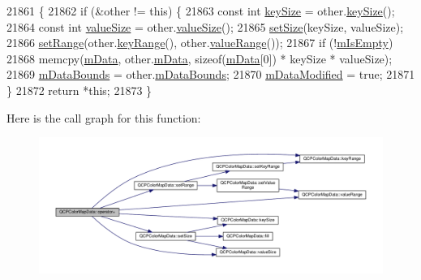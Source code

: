 \begin{DoxyCode}
21861                                                                         \{
21862   \textcolor{keywordflow}{if} (&other != \textcolor{keyword}{this}) \{
21863     \textcolor{keyword}{const} \textcolor{keywordtype}{int} \hyperlink{class_q_c_p_color_map_data_aa8d7811686fdfea964947715210c4af8}{keySize} = other.\hyperlink{class_q_c_p_color_map_data_aa8d7811686fdfea964947715210c4af8}{keySize}();
21864     \textcolor{keyword}{const} \textcolor{keywordtype}{int} \hyperlink{class_q_c_p_color_map_data_ab880be6bc587f34e8d22fe77ef6b57e9}{valueSize} = other.\hyperlink{class_q_c_p_color_map_data_ab880be6bc587f34e8d22fe77ef6b57e9}{valueSize}();
21865     \hyperlink{class_q_c_p_color_map_data_a0d9ff35c299d0478b682bfbcdd9c097e}{setSize}(keySize, valueSize);
21866     \hyperlink{class_q_c_p_color_map_data_aad9c1c7c703c1339489fc730517c83d4}{setRange}(other.\hyperlink{class_q_c_p_color_map_data_a4765180639742460f64ab6c97c745c08}{keyRange}(), other.\hyperlink{class_q_c_p_color_map_data_a025be4d7ba0494fd7b38a5a56c737f2a}{valueRange}());
21867     \textcolor{keywordflow}{if} (!\hyperlink{class_q_c_p_color_map_data_a10e91aa89ed05bd177b1f81e07b465b8}{mIsEmpty})
21868       memcpy(\hyperlink{class_q_c_p_color_map_data_ac1682862022f575191351c9825187d39}{mData}, other.\hyperlink{class_q_c_p_color_map_data_ac1682862022f575191351c9825187d39}{mData}, \textcolor{keyword}{sizeof}(\hyperlink{class_q_c_p_color_map_data_ac1682862022f575191351c9825187d39}{mData}[0]) * keySize * valueSize);
21869     \hyperlink{class_q_c_p_color_map_data_a1798b3dcc0a27091d196bfd156dcb3f2}{mDataBounds} = other.\hyperlink{class_q_c_p_color_map_data_a1798b3dcc0a27091d196bfd156dcb3f2}{mDataBounds};
21870     \hyperlink{class_q_c_p_color_map_data_ad3cc682da2ac14e5acdbc05cf4d3d93b}{mDataModified} = \textcolor{keyword}{true};
21871   \}
21872   \textcolor{keywordflow}{return} *\textcolor{keyword}{this};
21873 \}
\end{DoxyCode}


Here is the call graph for this function\+:\nopagebreak
\begin{figure}[H]
\begin{center}
\leavevmode
\includegraphics[width=350pt]{class_q_c_p_color_map_data_afdf4dd1b2f5714234fe84709b85c2a8d_cgraph}
\end{center}
\end{figure}


